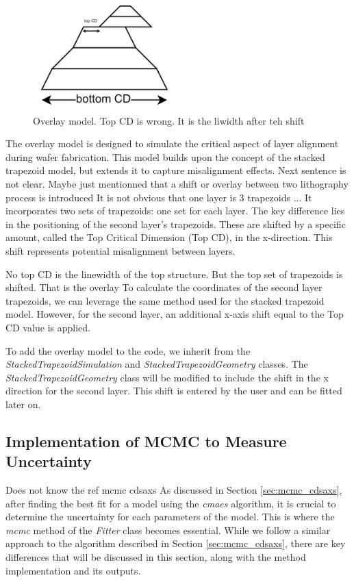 \begin{figure}[h]
    \centering
    \includegraphics[width=0.5\textwidth]{images/overlay.PNG}
    \caption{Overlay model. \color{red} Top CD is wrong. It is the liwidth after teh shift \color{black} 
    }
    \label{fig:overlay}
\end{figure}

\FloatBarrier

The overlay model is designed to simulate the critical aspect of layer alignment during wafer 
fabrication. This model builds upon the concept of the stacked trapezoid model, but extends it to 
capture misalignment effects. 
\color{red} Next sentence is not clear. Maybe just mentionned that a shift or overlay between two lithography process is introduced
It is not obvious that one layer is 3 trapezoids ...\color{black}
It incorporates two sets of trapezoids: one set for each layer. The 
key difference lies in the positioning of the second layer's trapezoids. These are shifted by a 
specific amount, called the Top Critical Dimension (Top CD), in the x-direction. This shift 
represents potential misalignment between layers.

\medskip
\color{red} No top CD is the linewidth of the top structure. 
But the top set of trapezoids is shifted. That is the overlay\color{black}
To calculate the coordinates of the second layer trapezoids, we can leverage the same method 
used for the stacked trapezoid model. However, for the second layer, an additional x-axis shift 
equal to the Top CD value is applied.

\medskip

To add the overlay model to the code, we inherit from the \textit{StackedTrapezoidSimulation} and \textit{StackedTrapezoidGeometry} classes.
The \textit{StackedTrapezoidGeometry} class will be modified to include the shift in the x direction for the second layer. This shift is entered by the
user and can be fitted later on.

\subsection{Implementation of MCMC to Measure Uncertainty}
\color{red} Does not know the ref mcmc cdsaxs \color{black}
As discussed in Section \ref{sec:mcmc_cdsaxs}, after finding the best fit for a model using the \textit{cmaes} algorithm, it is crucial 
to determine the uncertainty for each parameters of the model. This is where the \textit{mcmc} method of the \textit{Fitter} class becomes essential. 
While we follow a similar approach to the algorithm described in Section \ref{sec:mcmc_cdsaxs}, there are key differences that will be discussed 
in this section, along with the method implementation and its outputs.

